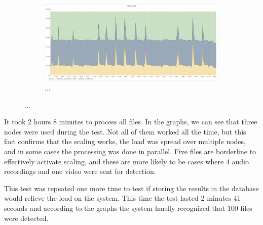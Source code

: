 \begin{figure}[H]
\begin{subfigure}[h]{0.5\linewidth}
        \centering
        \includegraphics[width=1\linewidth]{other-fig/tests/burst_ram1.png}
        \caption{...}
    \end{subfigure}
    \caption{...}
\end{figure}

It took 2 hours 8 minutes to process all files. In the graphs, we can see that three nodes were used during the test. Not all of them worked all the time, but this fact confirms that the scaling works, the load was spread over multiple nodes, and in some cases the processing was done in parallel. Five files are borderline to effectively activate scaling, and these are more likely to be cases where 4 audio recordings and one video were sent for detection.

This test was repeated one more time to test if storing the results in the database would relieve the load on the system. This time the test lasted 2 minutes 41 seconds and according to the graphs the system hardly recognized that 100 files were detected.

